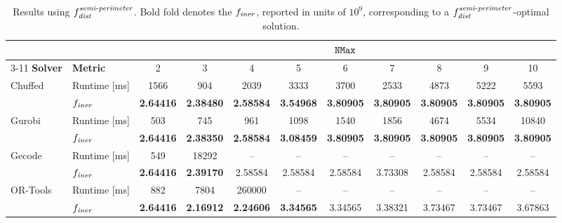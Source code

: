 \begin{landscape}
	
	\begin{table}[p]
		\centering
		\small
		\caption{Results using $f_{\mathit{dist}}^{\mathit{semi\text{-}perimeter}}$. Bold fold denotes the $f_\mathit{iner}$, reported in units of $10^9$, corresponding to a $f_{\mathit{dist}}^{\mathit{semi\text{-}perimeter}}$-optimal solution.}
		\label{tab:solvercomparison_distobj}
		\renewcommand{\arraystretch}{1.0}
		
		\begin{tabular}{p{1.5cm}p{1.5cm}ccccccccc}
			\toprule
			\multicolumn{2}{c}{} & \multicolumn{9}{c}{$\mathtt{NMax}$} \\
			\cmidrule(lr){3-11}
			\textbf{Solver} & \textbf{Metric} & 2 & 3 & 4 & 5 & 6 & 7 & 8 & 9 & 10 \\
			\midrule
			
			Chuffed & Runtime [ms]
			& 1566 & 904 & 2039 & 3333 & 3700 & 2533 & 4873 & 5222 & 5593 \\
			& $f_\mathit{iner}$
			& \textbf{2.64416}
			& \textbf{2.38480}
			& \textbf{2.58584}
			& \textbf{3.54968}
			& \textbf{3.80905}
			& \textbf{3.80905}
			& \textbf{3.80905}
			& \textbf{3.80905}
			& \textbf{3.80905} \\
			\midrule
			
			Gurobi & Runtime [ms]
			& 503 & 745 & 961 & 1098 & 1540 & 1856 & 4674 & 5534 & 10840 \\
			& $f_\mathit{iner}$
			& \textbf{2.64416}
			& \textbf{2.38350}
			& \textbf{2.58584}
			& \textbf{3.08459}
			& \textbf{3.80905}
			& \textbf{3.80905}
			& \textbf{3.80905}
			& \textbf{3.80905}
			& \textbf{3.80905} \\
			\midrule
			
			Gecode & Runtime [ms]
			& 549 & 18292 & -- & -- & -- & -- & -- & -- & -- \\
			& $f_\mathit{iner}$
			& \textbf{2.64416}
			& \textbf{2.39170}
			& 2.58584
			& 2.58584
			& 2.58584
			& 3.73308
			& 2.58584
			& 2.58584
			& 2.58584 \\
			\midrule
			
			OR-Tools & Runtime [ms]
			& 882 & 7804 & 260000 & -- & -- & -- & -- & -- & -- \\
			& $f_\mathit{iner}$
			& \textbf{2.64416}
			& \textbf{2.16912}
			& \textbf{2.24606}
			& \textbf{3.34565}
			& 3.34565
			& 3.38321
			& 3.73467
			& 3.73467
			& 3.67863 \\
			\bottomrule
		\end{tabular}
		
	\end{table}
	
\end{landscape}

